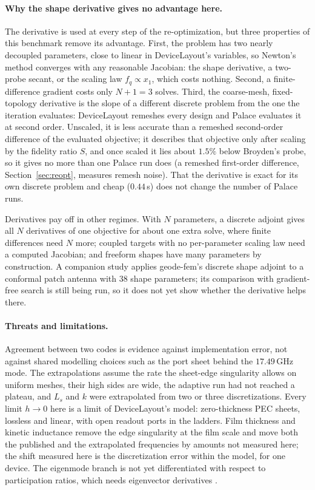 \documentclass{anvil-paper}
\begin{document}
\paragraph{Why the shape derivative gives no advantage here.}
The derivative is used at every step of the re-optimization, but three
properties of this benchmark remove its advantage. First, the problem has
two nearly decoupled parameters, close to linear in DeviceLayout's
variables, so Newton's method converges with any reasonable Jacobian: the
shape derivative, a two-probe secant, or the scaling law $f_q \propto x_1$,
which costs nothing. Second, a finite-difference gradient costs only $N+1 =
3$ solves. Third, the coarse-mesh, fixed-topology derivative is the slope
of a different discrete problem from the one the iteration evaluates:
DeviceLayout remeshes every design and Palace evaluates it at second
order. Unscaled, it is less accurate than a remeshed second-order
difference of the evaluated objective; it describes that objective only
after scaling by the fidelity ratio $S$, and once scaled it lies about
$1.5\%$ below Broyden's probe, so it gives no more than one Palace run
does (a remeshed first-order difference, Section~\ref{sec:reopt}, measures
remesh noise). That the
derivative is exact for its own discrete problem and cheap ($0.44$\,s)
does not change the number of Palace runs.

Derivatives pay off in other regimes. With $N$ parameters, a discrete
adjoint gives all $N$ derivatives of one objective for about one extra
solve, where finite differences need $N$ more; coupled targets with no
per-parameter scaling law need a computed Jacobian; and freeform shapes
have many parameters by construction. A companion study
\citep{walters2026conformal} applies geode-fem's discrete shape adjoint to
a conformal patch antenna with 38 shape parameters; its comparison with
gradient-free search is still being run, so it does not yet show whether
the derivative helps there.

\paragraph{Threats and limitations.}
Agreement between two codes is evidence against implementation error, not
against shared modelling choices such as the port sheet behind the
$17.49$\,GHz mode. The extrapolations assume the rate the sheet-edge
singularity allows on uniform meshes, their high sides are wide, the
adaptive run had not reached a plateau, and $L_s$ and $k$ were extrapolated
from two or three discretizations. Every limit $h \to 0$ here is a limit of
DeviceLayout's model: zero-thickness PEC sheets, lossless and linear, with
open readout ports in the ladders. Film thickness and kinetic inductance
remove the edge singularity at the film scale and move both the published
and the extrapolated frequencies by amounts not measured here; the shift
measured here is the discretization error within the model, for one
device. The eigenmode branch is not yet
differentiated with respect to participation ratios, which needs
eigenvector derivatives \citep{nelson1976simplified}.
\end{document}
